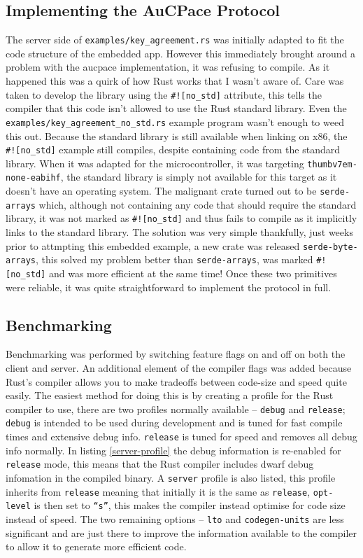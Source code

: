 \subsection{Implementing the AuCPace Protocol}
The server side of \texttt{examples/key\_agreement.rs} was initially adapted to fit the code structure of the embedded app.
However this immediately brought around a problem with the \gls{aucpace} implementation, it was refusing to compile.
As it happened this was a quirk of how Rust works that I wasn't aware of.
Care was taken to develop the library using the \verb|#![no_std]| attribute, this tells the compiler that this code isn't allowed to use the Rust standard library.
Even the \texttt{examples/key\_agreement\_no\_std.rs} example program wasn't enough to weed this out.
Because the standard library is still available when linking on x86, the \verb|#![no_std]| example still compiles, despite containing code from the standard library.
When it was adapted for the microcontroller, it was targeting \texttt{thumbv7em-none-eabihf}, the standard library is simply not available for this target as it doesn't have an operating system.
The malignant crate turned out to be \texttt{serde-arrays} which, although not containing any code that should require the standard library, it was not marked as \verb|#![no_std]| and thus fails to compile as it implicitly links to the standard library.
The solution was very simple thankfully, just weeks prior to attmpting this embedded example, a new crate was released \texttt{serde-byte-arrays}, this solved my problem better than \texttt{serde-arrays}, was marked \verb|#![no_std]| and was more efficient at the same time!
Once these two primitives were reliable, it was quite straightforward to implement the protocol in full.

\subsection{Benchmarking}
Benchmarking was performed by switching feature flags on and off on both the client and server.
An additional element of the compiler flags was added because Rust's compiler allows you to make tradeoffs between code-size and speed quite easily.
The easiest method for doing this is by creating a profile for the Rust compiler to use, there are two profiles normally available -- \texttt{debug} and \texttt{release}; \texttt{debug} is intended to be used during development and is tuned for fast compile times and extensive debug info. \texttt{release} is tuned for speed and removes all debug info normally.
In listing \ref{server-profile} the debug information is re-enabled for \texttt{release} mode, this means that the Rust compiler includes \gls{dwarf} debug infomation in the compiled binary.
A \texttt{server} profile is also listed, this profile inherits from \texttt{release} meaning that initially it is the same as \texttt{release}, \texttt{opt-level} is then set to \texttt{\enquote{s}}, this makes the compiler instead optimise for code size instead of speed.
The two remaining options -- \texttt{lto} and \texttt{codegen-units} are less significant and are just there to improve the information available to the compiler to allow it to generate more efficient code.

